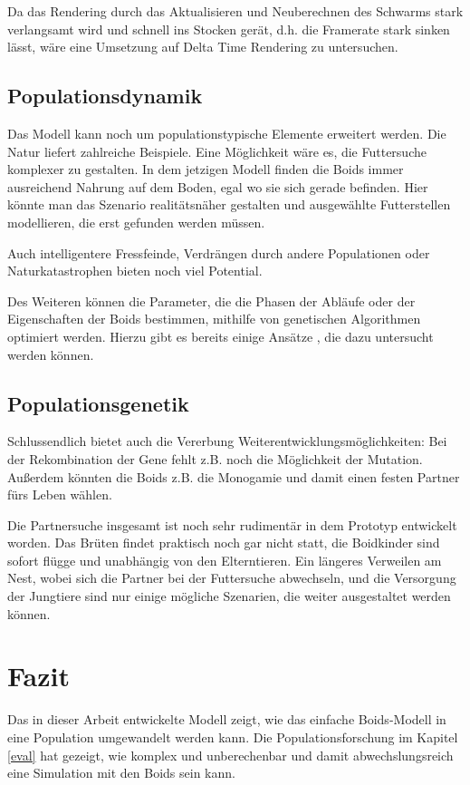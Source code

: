\documentclass[draft=false
              ,paper=a4
              ,twoside=false
              ,fontsize=11pt
              ,headsepline
              ,BCOR10mm
              ,DIV11
              ,bibtotoc
              ,liststotoc
              ]{scrbook}
\begin{document}
Da das Rendering durch das Aktualisieren und Neuberechnen des Schwarms stark verlangsamt wird und schnell ins Stocken gerät, d.h. die Framerate stark sinken lässt, wäre eine Umsetzung auf Delta Time Rendering zu untersuchen.

\subsection{Populationsdynamik}
Das Modell kann noch um populationstypische Elemente erweitert werden. Die Natur liefert zahlreiche Beispiele. Eine Möglichkeit wäre es, die Futtersuche komplexer zu gestalten. In dem jetzigen Modell finden die Boids immer ausreichend Nahrung auf dem Boden, egal wo sie sich gerade befinden. Hier könnte man das Szenario realitätsnäher gestalten und ausgewählte Futterstellen modellieren, die erst gefunden werden müssen.

Auch intelligentere Fressfeinde, Verdrängen durch andere Populationen oder Naturkatastrophen bieten noch viel Potential.

Des Weiteren können die Parameter, die die Phasen der Abläufe oder der Eigenschaften der Boids bestimmen, mithilfe von genetischen Algorithmen optimiert werden. Hierzu gibt es bereits einige Ansätze \cite{sab92:reynolds}\cite{oai:CiteSeerXPSU:10.1.1.61.9858}\cite{conf/ecms/AlaliyatYS14}, die dazu untersucht werden können.

\subsection{Populationsgenetik}
Schlussendlich bietet auch die Vererbung Weiterentwicklungsmöglichkeiten: Bei der Rekombination der Gene fehlt z.B. noch die Möglichkeit der Mutation. Außerdem könnten die Boids z.B. die Monogamie und damit einen festen Partner fürs Leben wählen.

Die Partnersuche insgesamt ist noch sehr rudimentär in dem Prototyp entwickelt worden. Das Brüten findet praktisch noch gar nicht statt, die Boidkinder sind sofort flügge und unabhängig von den Elterntieren. Ein längeres Verweilen am Nest, wobei sich die Partner bei der Futtersuche abwechseln, und die Versorgung der Jungtiere sind nur einige mögliche Szenarien, die weiter ausgestaltet werden können.

\section{Fazit}
Das in dieser Arbeit entwickelte Modell zeigt, wie das einfache Boids-Modell in eine Population umgewandelt werden kann. Die Populationsforschung im Kapitel \ref{eval} hat gezeigt, wie komplex und unberechenbar und damit abwechslungsreich eine Simulation mit den Boids sein kann.
\end{document}
